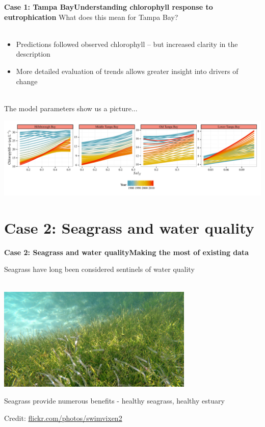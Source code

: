 \documentclass[serif]{beamer}\usepackage[]{graphicx}\usepackage[]{color}
\begin{document}
\begin{frame}{\textbf{Case 1: Tampa Bay}}{\textbf{Understanding chlorophyll response to eutrophication}}
\onslide<+->
What does this mean for Tampa Bay?\\~\\
\begin{itemize}
\item Predictions followed observed chlorophyll -- but increased clarity in the description
\item More detailed evaluation of trends allows greater insight into drivers of change\\~\\
\end{itemize}
\onslide<+->
The model parameters show us a picture...
\centerline{\includegraphics[width = \textwidth]{fig/title_plo.pdf}}
\end{frame}

\section{Case 2: Seagrass and water quality}

\begin{frame}{\textbf{Case 2: Seagrass and water quality}}{\textbf{Making the most of existing data}}
\begin{center}
Seagrass have long been considered sentinels of water quality \\~\\
\centerline{\includegraphics[width = 0.7\textwidth]{fig/sg_pic.png}}
\vspace{0.1in}
Seagrass provide numerous benefits - healthy seagrass, healthy estuary
\end{center}
\vfill
\tiny
\hfill Credit: \href{https://www.flickr.com/photos/swimvixen2/3581613875/in/photostream/}{flickr.com/photos/swimvixen2}
\end{frame}
\end{document}
